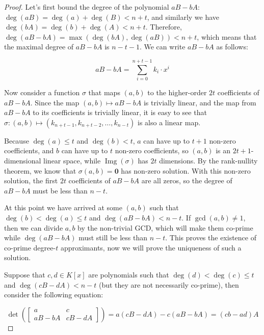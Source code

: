 \documentclass{article}
\begin{document}
\begin{proof}\label{proof:best-approximant-theorem}
    Let's first bound the degree of the polynomial $aB - bA$: $\deg(aB) = \deg(a) + \deg(B) < n + t$, and similarly we have $\deg(bA) = \deg(b) + \deg(A) < n + t$. Therefore, $\deg(aB - bA) = \max(\deg(bA), \deg(aB)) < n + t$, which means that the maximal degree of $aB - bA$ is $n - t - 1$. We can write $aB - bA$ as follows:

    \begin{equation*}
        aB - bA = \sum_{i=0}^{n+t-1}k_{i} \cdot x^{i}
    \end{equation*}

    Now consider a function $\sigma$ that maps $(a, b)$ to the higher-order $2t$ coefficients of $aB - bA$. Since the map $(a, b) \mapsto aB - bA$ is trivially linear, and the map from $aB - bA$ to its coefficients is trivially linear, it is easy to see that $\sigma: (a, b) \mapsto (k_{n+t-1}, k_{n+t-2}, \ldots, k_{n-t})$ is also a linear map.

    Because $\deg(a) \leq t$ and $\deg(b) < t$, $a$ can have up to $t+1$ non-zero coefficients, and $b$ can have up to $t$ non-zero coefficients, so $(a, b)$ is an $2t+1$-dimensional linear space, while $\mathop{\text{Img}}(\sigma)$ has $2t$ dimensions. By the rank-nullity theorem, we know that $\sigma(a, b) = \mathbf{0}$ has non-zero solution. With this non-zero solution, the first $2t$ coefficients of $aB - bA$ are all zeros, so the degree of $aB - bA$ must be less than $n - t$.


    At this point we have arrived at some $(a, b)$ such that $\deg(b) < \deg(a) \leq t$ and $\deg(aB - bA) < n - t$. If $\gcd(a, b) \neq 1$, then we can divide $a, b$ by the non-trivial GCD, which will make them co-prime while $\deg(aB - bA)$ must still be less than $n - t$. This proves the existence of co-prime degree-$t$ approximants, now we will prove the uniqueness of such a solution.

    Suppose that $c, d \in K[x]$ are polynomials such that $\deg(d) < \deg(c) \leq t$ and $\deg(cB-dA) < n-t$ (but they are not necessarily co-prime), then consider the following equation:

    \begin{equation*}
        \det\left(
            \begin{bmatrix}
                a & c \\
                aB-bA & cB-dA
            \end{bmatrix}
        \right) = a(cB-dA) - c(aB-bA) = (cb - ad)A
    \end{equation*}


\end{proof}
\end{document}
